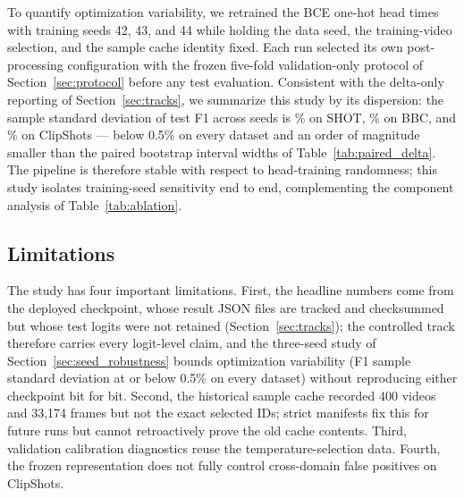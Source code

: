To quantify optimization variability, we retrained the BCE one-hot head
\PaperSeedCount{} times with training seeds 42, 43, and 44 while holding the
data seed, the training-video selection, and the sample cache identity fixed.
Each run selected its own post-processing configuration with the frozen
five-fold validation-only protocol of Section~\ref{sec:protocol} before any
test evaluation. Consistent with the delta-only reporting of
Section~\ref{sec:tracks}, we summarize this study by its dispersion: the
sample standard deviation of test F1 across seeds is
\PaperSeedShotFOneStd\% on SHOT, \PaperSeedBBCFOneStd\% on BBC, and
\PaperSeedClipFOneStd\% on ClipShots --- below 0.5\% on every dataset and an
order of magnitude smaller than the paired bootstrap interval widths of
Table~\ref{tab:paired_delta}. The pipeline is therefore stable with respect
to head-training randomness; this study isolates training-seed sensitivity
end to end, complementing the component analysis of
Table~\ref{tab:ablation}.

\subsection{Limitations}

The study has four important limitations. First, the headline numbers come
from the deployed checkpoint, whose result JSON files are tracked and
checksummed but whose test logits were not retained
(Section~\ref{sec:tracks}); the controlled track therefore carries every
logit-level claim, and the three-seed study of
Section~\ref{sec:seed_robustness} bounds optimization variability (F1 sample
standard deviation at or below 0.5\% on every dataset) without reproducing
either checkpoint bit for bit. Second, the historical sample cache recorded
400 videos and 33,174 frames but not the exact selected IDs; strict
manifests fix this for future runs but cannot retroactively prove the old
cache contents. Third, validation calibration diagnostics reuse the
temperature-selection data. Fourth, the frozen representation does not fully
control cross-domain false positives on ClipShots.
